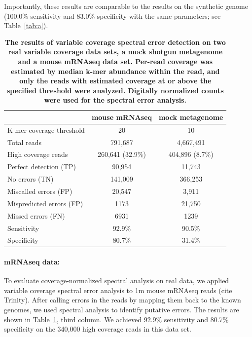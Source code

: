 \documentclass{article}
\begin{document}
Importantly, these results are comparable to the results on the
synthetic genome (100.0\% sensitivity and 83.0\% specificity with the
same parameters; see Table~\ref{tab:a}).


\begin{table}
\begin{tabular}{|l|c||c|}
\hline
& {\bf mouse mRNAseq} & {\bf mock metagenome} \\
\hline
K-mer coverage threshold   & 20              & 10              \\
Total reads                & 791,687         & 4,667,491       \\
High coverage reads        & 260,641 (32.9\%) & 404,896 (8.7\%) \\
\hline
Perfect detection (TP)     & 90,954          & 11,743          \\
No errors (TN)             & 141,009         & 366,253         \\
Miscalled errors (FP)      & 20,547          & 3,911           \\
Mispredicted errors (FP)   & 1173            & 21,750          \\
Missed errors (FN)         & 6931            & 1239            \\
\hline
Sensitivity                & 92.9\%          & 90.5\%          \\
Specificity                & 80.7\%          & 31.4\%          \\
\hline
\end{tabular}

\caption{{\bf The results of variable coverage spectral error detection on
  two real variable coverage data sets, a mock shotgun metagenome and
  a mouse mRNAseq data set. Per-read coverage was estimated by median
  k-mer abundance within the read, and only the reads with estimated
  coverage at or above the specified threshold were analyzed.
  Digitally normalized counts were used for the spectral error analysis.}}
\label{tab:spectra_variable_real}

\end{table}

\paragraph{mRNAseq data:}


To evaluate coverage-normalized spectral analysis on real data, we
applied variable coverage spectral error analysis to 1m mouse mRNAseq
reads (cite Trinity).  After calling errors in the reads by mapping
them back to the known genomes, we used spectral analysis to identify
putative errors.  The results are shown in
Table~\ref{tab:spectra_variable_real}, third column.  We achieved
92.9\% sensitivity and 80.7\% specificity on the 340,000 high coverage
reads in this data set.
\end{document}
